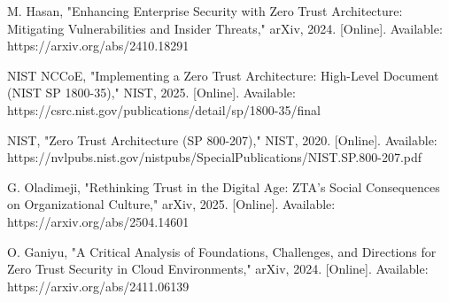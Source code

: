 \documentclass[conference]{IEEEtran}
\begin{document}
\begin{thebibliography}{15}
 M. Hasan, "Enhancing Enterprise Security with Zero Trust Architecture: Mitigating Vulnerabilities and Insider Threats," arXiv, 2024. [Online]. Available: https://arxiv.org/abs/2410.18291

 NIST NCCoE, "Implementing a Zero Trust Architecture: High-Level Document (NIST SP 1800-35)," NIST, 2025. [Online]. Available: https://csrc.nist.gov/publications/detail/sp/1800-35/final

 NIST, "Zero Trust Architecture (SP 800-207)," NIST, 2020. [Online]. Available: https://nvlpubs.nist.gov/nistpubs/SpecialPublications/NIST.SP.800-207.pdf

 G. Oladimeji, "Rethinking Trust in the Digital Age: ZTA’s Social Consequences on Organizational Culture," arXiv, 2025. [Online]. Available: https://arxiv.org/abs/2504.14601

 O. Ganiyu, "A Critical Analysis of Foundations, Challenges, and Directions for Zero Trust Security in Cloud Environments," arXiv, 2024. [Online]. Available: https://arxiv.org/abs/2411.06139

\end{thebibliography}
\end{document}
